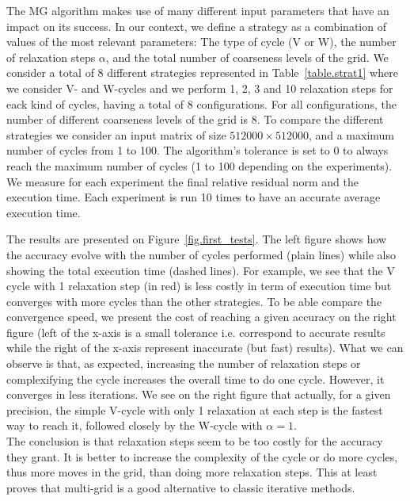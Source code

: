 The MG algorithm makes use of many different input parameters that have an impact on its success. 
In our context, we define a strategy as a combination of values of the most relevant parameters: The type of cycle (V or W), the number of relaxation steps $\alpha$, and the total number of coarseness levels of the grid. 
We consider a total of 8 different strategies represented in Table~\ref{table.strat1} where we consider V- and W-cycles and we perform 1, 2, 3 and 10 relaxation steps for eack kind of cycles, having a total of 8 configurations. 
For all configurations, the number of different coarseness levels of the grid is 8.
To compare the different strategies we consider an input matrix of size $512000 \times 512000$, 
and a maximum number of cycles from 1 to 100.
The algorithm's tolerance is set to $0$ to always reach the maximum number of cycles (1 to 100 depending on the experiments).
We measure for each experiment the final relative residual norm and the execution time. 
Each experiment is run 10 times to have an accurate average execution time.

The results are presented on Figure~\ref{fig.first_tests}.
The left figure shows how the accuracy evolve with the number of cycles performed (plain lines) while also showing the total execution time (dashed lines). For example, we see that the V cycle with 1 relaxation step (in red) is less costly in term of execution time but converges with more cycles than the other strategies. To be able compare the convergence speed, we present the cost of reaching
a given accuracy on the right figure (left of the x-axis is a small tolerance i.e. correspond to accurate results while the right of the x-axis represent inaccurate (but fast) results).
What we can observe is that, as expected, increasing the number of relaxation steps or complexifying the cycle increases the overall time to do one cycle. However, it converges in less iterations.
We see on the right figure that actually, for a given precision, the simple V-cycle with only 1 relaxation at each step is the fastest way to reach it, followed closely by the W-cycle with $\alpha=1$.\\
The conclusion is that relaxation steps seem to be too costly for the accuracy they grant. It is better to increase the complexity of the cycle or do more cycles, thus more moves in the grid, than doing more relaxation steps. This at least proves
that multi-grid is a good alternative to classic iterative methods.
